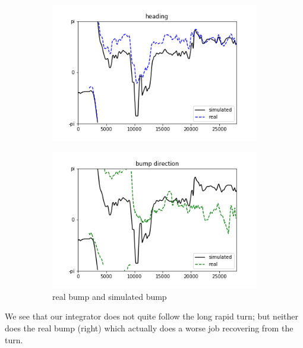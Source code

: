 \documentclass{article}
\begin{document}
\begin{figure}[h]
	\centering
	\begin{subfigure}[t]{0.73\linewidth}
		\centering
		\includegraphics[width = 1.0\linewidth, trim={0 0 0 0}, clip=true]{../figures/sim_head.png}
		\label{fig:F}	
	\end{subfigure}
	\hspace{0.1\linewidth}
	\begin{subfigure}[t]{0.73\linewidth}
		\centering
		\includegraphics[width = 1.0\linewidth, trim={0 0 0 0}, clip=true]{../figures/sim_bump.png}
		\caption{real bump and simulated bump}
		\label{fig:dF}
	\end{subfigure}
\caption{}
\label{fig:fit}
\end{figure}

We see that our integrator does not quite follow the long rapid turn; but neither does the real bump (right) which actually does a worse job recovering from the turn.
\end{document}
